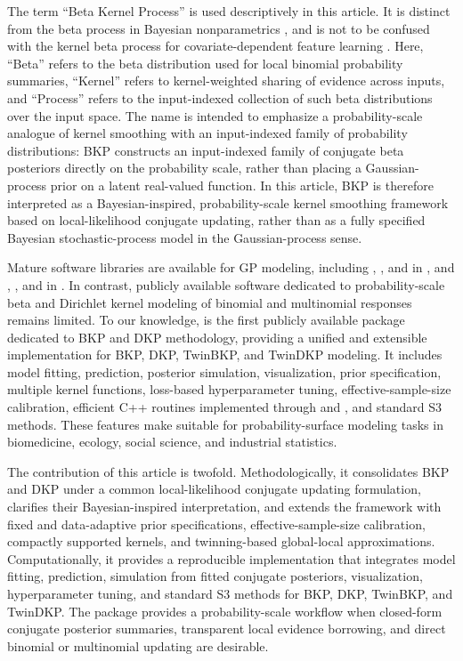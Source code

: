 \documentclass[article, shortnames]{jss}
\begin{document}
The term ``Beta Kernel Process'' is used descriptively in this article. It is distinct from the beta process in Bayesian nonparametrics \citep{Hjort1990BP}, and is not to be confused with the kernel beta process for covariate-dependent feature learning \citep{Ren2011KBP}. 
Here, ``Beta'' refers to the beta distribution used for local binomial probability summaries, ``Kernel'' refers to kernel-weighted sharing of evidence across inputs, and ``Process'' refers to the input-indexed collection of such beta distributions over the input space. 
The name is intended to emphasize a probability-scale analogue of kernel smoothing with an input-indexed family of probability distributions: BKP constructs an input-indexed family of conjugate beta posteriors directly on the probability scale, rather than placing a Gaussian-process prior on a latent real-valued function.
In this article, BKP is therefore interpreted as a Bayesian-inspired, probability-scale kernel smoothing framework based on local-likelihood conjugate updating, rather than as a fully specified Bayesian stochastic-process model in the Gaussian-process sense.

Mature software libraries are available for GP modeling, including  \citep{Roustant2012DiceKriging},  \citep{MacDonald2015GPfit}, and  \citep{Piironen2022gplite} in , and  \citep{Gardner2018GPyTorch},  \citep{Matthews2017GPflow}, and  \citep{gpy2014} in . 
In contrast, publicly available software dedicated to probability-scale beta and Dirichlet kernel modeling of binomial and multinomial responses remains limited. 
To our knowledge,  is the first publicly available  package dedicated to BKP and DKP methodology, providing a unified and extensible implementation for BKP, DKP, TwinBKP, and TwinDKP modeling. 
It includes model fitting, prediction, posterior simulation, visualization, prior specification, multiple kernel functions, loss-based hyperparameter tuning, effective-sample-size calibration, efficient C++ routines implemented through  \citep{Eddelbuettel2011Rcpp} and  \citep{Eddelbuettel2014RcppArmadillo}, and standard S3 methods. 
These features make  suitable for probability-surface modeling tasks in biomedicine, ecology, social science, and industrial statistics.

The contribution of this article is twofold. 
Methodologically, it consolidates BKP and DKP under a common local-likelihood conjugate updating formulation, clarifies their Bayesian-inspired interpretation, and extends the framework with fixed and data-adaptive prior specifications, effective-sample-size calibration, compactly supported kernels, and twinning-based global-local approximations. 
Computationally, it provides a reproducible  implementation that integrates model fitting, prediction, simulation from fitted conjugate posteriors, visualization, hyperparameter tuning, and standard S3 methods for BKP, DKP, TwinBKP, and TwinDKP. The package provides a probability-scale workflow when closed-form conjugate posterior summaries, transparent local evidence borrowing, and direct binomial or multinomial updating are desirable.
\end{document}
